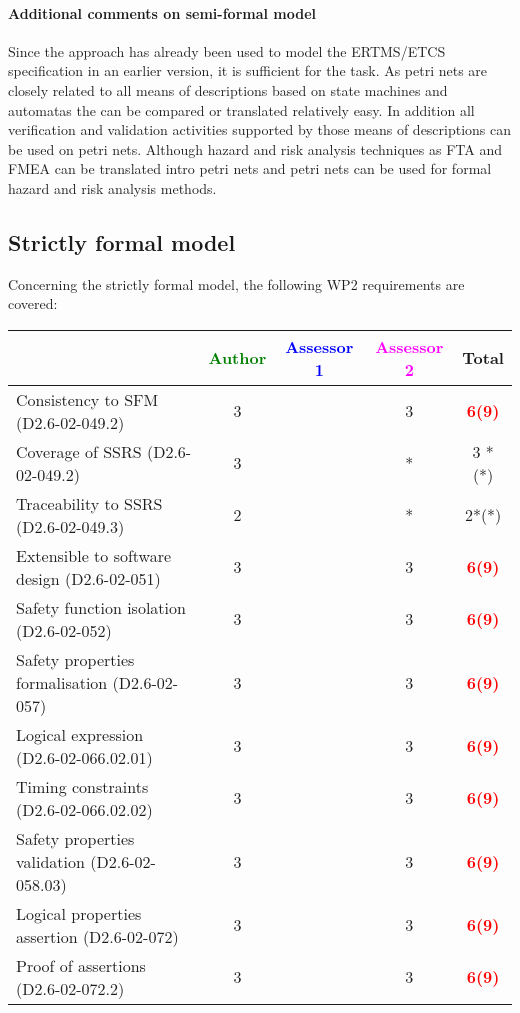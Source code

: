 \paragraph{Additional comments on semi-formal  model} 
Since the approach has already been used to model the ERTMS/ETCS specification in an earlier version, it is sufficient for the task.
As petri nets are closely related to all means of descriptions based on state machines and automatas the can be compared or translated relatively easy. In addition all verification and validation activities supported by those means of descriptions can be used on petri nets. Although hazard and risk analysis techniques as FTA and FMEA can be translated intro petri nets and petri nets can be used for formal hazard and risk analysis methods.


\subsection{Strictly formal model}

Concerning the strictly formal model, the following WP2 requirements are covered:

\begin{tabular}{|l | c | c | c | c|}
\hline
& \textcolor{green}{Author} & \textcolor{blue}{Assessor 1} & \textcolor{magenta}{Assessor 2} & Total \\
\hline 
Consistency to SFM (D2.6-02-049.2) & 3     & & 3     &\textcolor{red}{\textbf{6(9)}}  \\
\hline
Coverage of SSRS (D2.6-02-049.2)  & 3     & & * & 3 *(*) \\
\hline
Traceability to  SSRS (D2.6-02-049.3)  & 2     & & * &  2*(*) \\
\hline
Extensible to software design (D2.6-02-051)  & 3     & & 3     &\textcolor{red}{\textbf{6(9)}}  \\
\hline
Safety function isolation (D2.6-02-052)  & 3     & & 3     &\textcolor{red}{\textbf{6(9)}}  \\
\hline 
Safety properties formalisation (D2.6-02-057)  & 3     & & 3     &\textcolor{red}{\textbf{6(9)}}  \\
\hline
Logical expression (D2.6-02-066.02.01)  & 3     & & 3     &\textcolor{red}{\textbf{6(9)}}  \\
\hline
Timing constraints (D2.6-02-066.02.02)  & 3     & & 3     &\textcolor{red}{\textbf{6(9)}}  \\
\hline
Safety properties validation (D2.6-02-058.03)  & 3     & & 3     &\textcolor{red}{\textbf{6(9)}}  \\
\hline
Logical properties assertion (D2.6-02-072)  & 3     & & 3     &\textcolor{red}{\textbf{6(9)}}  \\
\hline
Proof of assertions (D2.6-02-072.2)  & 3     & & 3     &\textcolor{red}{\textbf{6(9)}}  \\
\hline
\end{tabular}


